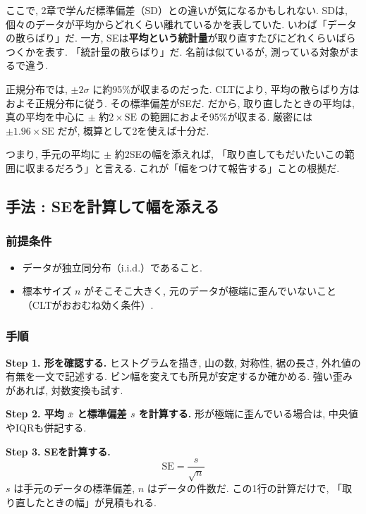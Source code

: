     ここで, 2章で学んだ標準偏差（SD）との違いが気になるかもしれない.
    SDは, 個々のデータが平均からどれくらい離れているかを表していた.
    いわば「データの散らばり」だ.
    一方, SEは\textbf{平均という統計量}が取り直すたびにどれくらいばらつくかを表す.
    「統計量の散らばり」だ.
    名前は似ているが, 測っている対象がまるで違う.

    正規分布では, $\pm 2\sigma$ に約95\%が収まるのだった.
    CLTにより, 平均の散らばり方はおよそ正規分布に従う.
    その標準偏差がSEだ.
    だから, 取り直したときの平均は, 真の平均を中心に $\pm$ 約$2 \times \mathrm{SE}$ の範囲におよそ95\%が収まる.
    厳密には $\pm 1.96 \times \mathrm{SE}$ だが, 概算として2を使えば十分だ.

    つまり, 手元の平均に $\pm$ 約$2$SEの幅を添えれば, 「取り直してもだいたいこの範囲に収まるだろう」と言える.
    これが「幅をつけて報告する」ことの根拠だ.

  \subsection{手法 : SEを計算して幅を添える}

    \subsubsection*{前提条件}
    \begin{itemize}
      \item データが独立同分布（i.i.d.）であること.
      \item 標本サイズ $n$ がそこそこ大きく, 元のデータが極端に歪んでいないこと（CLTがおおむね効く条件）.
    \end{itemize}

    \subsubsection*{手順}

    \textbf{Step 1. 形を確認する.}
    ヒストグラムを描き, 山の数, 対称性, 裾の長さ, 外れ値の有無を一文で記述する.
    ビン幅を変えても所見が安定するか確かめる.
    強い歪みがあれば, 対数変換も試す.

    \textbf{Step 2. 平均 $\bar{x}$ と標準偏差 $s$ を計算する.}
    形が極端に歪んでいる場合は, 中央値やIQRも併記する.

    \textbf{Step 3. SEを計算する.}
    \[
      \mathrm{SE} = \frac{s}{\sqrt{n}}
    \]
    $s$ は手元のデータの標準偏差, $n$ はデータの件数だ.
    この1行の計算だけで, 「取り直したときの幅」が見積もれる.

